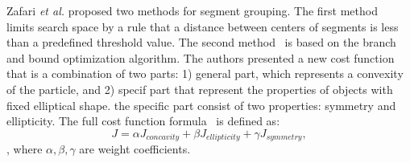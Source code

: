 \documentclass{lutmscthesis}[2010/09/22]
\begin{document}
\begin{figure}[htp]
\end{figure}

Zafari \emph{et al.} proposed two methods for segment grouping.  The first method~\cite{zafari-bb} limits search space by a rule that a distance between centers of segments is less than a predefined threshold value. The second method~\cite{zafari-bb} is based on the branch and bound optimization algorithm. The authors presented a new cost function that is a combination of two parts: 1) general part, which represents a convexity of the particle, and 2) specif part that represent the properties of objects with fixed elliptical shape. the specific part consist of two properties: symmetry and ellipticity. The full cost function formula~\cite{zafari-bb} is defined as:
\begin{equation}
    J = \alpha J_{concavity}+\beta J_{ellipticity} + \gamma J_{symmetry},
\end{equation}, where $\alpha,\beta,\gamma$ are weight coefficients.
\end{document}
